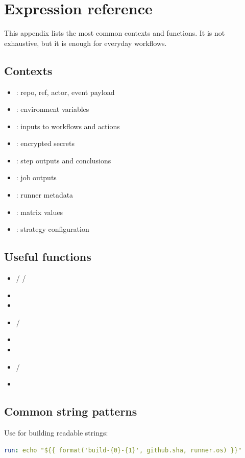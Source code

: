\chapter{Expression reference}

This appendix lists the most common contexts and functions.
It is not exhaustive, but it is enough for everyday workflows.

\section{Contexts}
\begin{itemize}[nosep]
  \item {}: repo, ref, actor, event payload
  \item {}: environment variables
  \item {}: inputs to workflows and actions
  \item {}: encrypted secrets
  \item {}: step outputs and conclusions
  \item {}: job outputs
  \item {}: runner metadata
  \item {}: matrix values
  \item {}: strategy configuration
\end{itemize}

\section{Useful functions}
\begin{itemize}[nosep]
  \item {} /  / 
  \item {}
  \item {}
  \item {} / 
  \item {}
  \item {}
  \item {} / 
  \item {}
\end{itemize}

\section{Common string patterns}
Use  for building readable strings:
\begin{lstlisting}[language=YAML]
run: echo "${{ format('build-{0}-{1}', github.sha, runner.os) }}"
\end{lstlisting}

